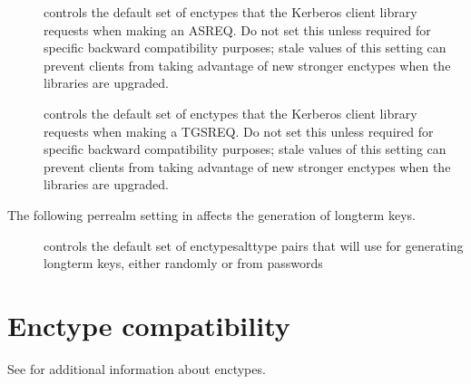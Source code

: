 \documentclass[letterpaper,10pt,english]{sphinxmanual}
\begin{document}
\begin{description}
\item[{}] \leavevmode
\sphinxAtStartPar
controls the default set of enctypes that the Kerberos client
library requests when making an AS\sphinxhyphen{}REQ.  Do not set this unless
required for specific backward compatibility purposes; stale
values of this setting can prevent clients from taking advantage
of new stronger enctypes when the libraries are upgraded.

\item[{}] \leavevmode
\sphinxAtStartPar
controls the default set of enctypes that the Kerberos client
library requests when making a TGS\sphinxhyphen{}REQ.  Do not set this unless
required for specific backward compatibility purposes; stale
values of this setting can prevent clients from taking advantage
of new stronger enctypes when the libraries are upgraded.

\end{description}

\sphinxAtStartPar
The following per\sphinxhyphen{}realm setting in {\hyperref[\detokenize{admin/conf_files/kdc_conf:kdc-conf-5}]{}} affects the
generation of long\sphinxhyphen{}term keys.
\begin{description}
\item[{}] \leavevmode
\sphinxAtStartPar
controls the default set of enctype\sphinxhyphen{}salttype pairs that {\hyperref[\detokenize{admin/admin_commands/kadmind:kadmind-8}]{}}
will use for generating long\sphinxhyphen{}term keys, either randomly or from
passwords

\end{description}


\section{Enctype compatibility}
\label{\detokenize{admin/enctypes:enctype-compatibility}}
\sphinxAtStartPar
See {\hyperref[\detokenize{admin/conf_files/kdc_conf:encryption-types}]{}} for additional information about enctypes.
\end{document}
